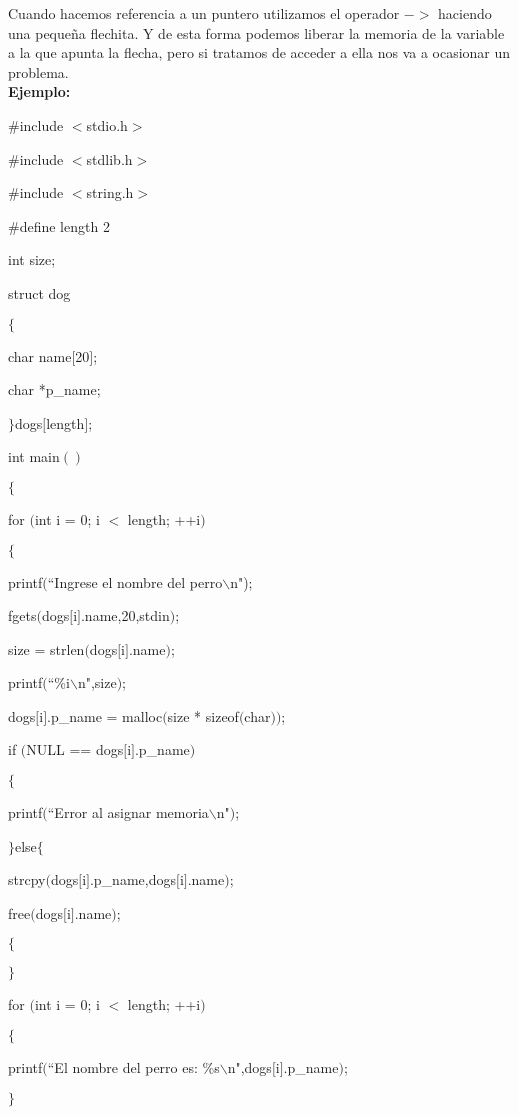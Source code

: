\documentclass[]{article}
\begin{document}
	Cuando hacemos referencia a un puntero utilizamos el operador $->$ haciendo una pequeña flechita. Y de esta forma podemos liberar la memoria de la variable a la que apunta la flecha, pero si tratamos de acceder a ella nos va a ocasionar un problema.\\
	
	\textbf{Ejemplo:\\}
	
	\#include $<$stdio.h$>$
	
	\#include $<$stdlib.h$>$
	
	\#include $<$string.h$>$
	
	\#define length 2
	
	int size;
	
	struct dog
	
	$\lbrace$
	
	char name$[$20$]$;
	
	char *p\_name;
	
	$\rbrace$dogs$[$length$]$;
	
	int main$()$
	
	$\lbrace$
	
	for $($int i = 0; i $<$ length; ++i$)$
	
	$\lbrace$
	
	printf$($``Ingrese el nombre del perro$\backslash$n");
	
	fgets$($dogs$[$i$]$.name,20,stdin$)$;
	
	size = strlen$($dogs$[$i$]$.name$)$;
	
	printf$($``\%i$\backslash$n",size$)$;
	
	dogs$[$i$]$.p\_name = malloc$($size * sizeof$($char$))$;
	
	if $($NULL == dogs$[$i$]$.p\_name$)$
	
	$\lbrace$
	
	printf$($``Error al asignar memoria$\backslash$n"$)$;
	
	$\rbrace$else$\lbrace$
	
	strcpy$($dogs$[$i$]$.p\_name,dogs$[$i$]$.name$)$;
	
	free$($dogs$[$i$]$.name$)$;
	
	$\lbrace$
	
	$\rbrace$
	
	for $($int i = 0; i $<$ length; ++i$)$
	
	$\lbrace$
	
	printf$($``El nombre del perro es: \%s$\backslash$n",dogs$[$i$]$.p\_name$)$;
	
	$\rbrace$
	
\end{document}
